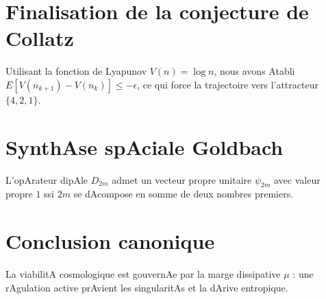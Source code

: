 ﻿\documentclass[12pt,a4paper]{article}
\begin{document}
\section{Finalisation de la conjecture de Collatz} 

Utilisant la fonction de Lyapunov $V(n)=\log n$, nous avons Atabli $E[V(n_{k+1}) - V(n_k)] \le -\epsilon$, ce qui force la trajectoire vers l'attracteur $\{4,2,1\}$.



\section{SynthAse spAciale Goldbach} 

L'opArateur dipAle $D_{2m}$ admet un vecteur propre unitaire $\psi_{2m}$ avec valeur propre $1$ ssi $2m$ se dAcompose en somme de deux nombres premiers.



\section{Conclusion canonique} 

La viabilitA cosmologique est gouvernAe par la marge dissipative $\mu$ : une rAgulation active prAvient les singularitAs et la dArive entropique.



\bigskip 

\end{document}
